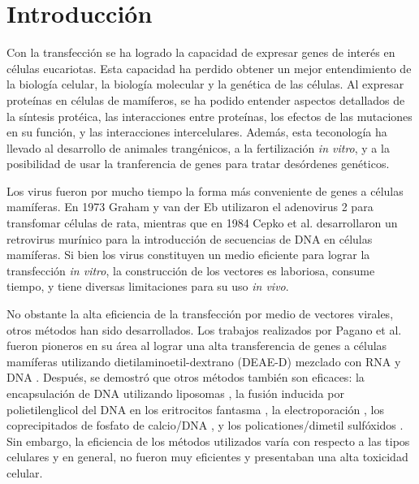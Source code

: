 \documentclass[fleqn,10pt]{SelfArx} %
\affiliation{\textsuperscript{1}\textit{Facultad de Ciencias Biológicas, Universidad Ricardo Palma, Lima, Peru}} %
\affiliation{*\textbf{Correspondencia}: jmanuel9112@icloud.com / giancuneo@gmail.com } %
\begin{document}
\flushbottom %

\maketitle %

\tableofcontents %

\thispagestyle{empty} %


\section{Introducción} 

Con la transfección se ha logrado la capacidad de expresar genes de interés en células eucariotas. Esta capacidad ha perdido obtener un mejor entendimiento de la biología celular, la biología molecular y la genética de las células. Al expresar proteínas en células de mamíferos, se ha podido entender aspectos detallados de la síntesis protéica, las interacciones entre proteínas, los efectos de las mutaciones en su función, y las interacciones intercelulares. Además, esta teconología ha llevado al desarrollo de animales trangénicos, a la fertilización \textit{in vitro}, y a la posibilidad de usar la tranferencia de genes para tratar desórdenes genéticos.

Los virus fueron por mucho tiempo la forma más conveniente de genes a células mamíferas. En 1973 Graham y van der Eb \cite{Graham:1973aa} utilizaron el adenovirus 2 para transfomar células de rata, mientras que en 1984 Cepko et al. \cite{Cepko:1984aa} desarrollaron un retrovirus murínico para la introducción de secuencias de DNA en células mamíferas. Si bien los virus constituyen un medio eficiente para lograr la transfección \textit{in vitro}, la construcción de los vectores es laboriosa, consume tiempo, y tiene diversas limitaciones para su uso \textit{in vivo}.

No obstante la alta eficiencia de la transfección por medio de vectores virales, otros métodos han sido desarrollados. Los trabajos realizados por Pagano et al. fueron pioneros en su área al lograr una alta transferencia de genes a células mamíferas utilizando dietilaminoetil-dextrano (DEAE-D) mezclado con RNA y DNA  \cite{McCutchan:1968aa, Pagano:1967aa}. Después, se demostró que otros métodos también son eficaces: la encapsulación de DNA utilizando liposomas \cite{Fraley:1980aa, Wong:1980aa, Straubinger:1983aa, Fraley:1981aa}, la fusión inducida por polietilenglicol del DNA en los eritrocitos fantasma \cite{Straus:1980aa}, la electroporación \cite{Neumann:1982aa}, los coprecipitados de fosfato de calcio/DNA \cite{Wigler:1979aa}, y los policationes/dimetil sulfóxidos \cite{Kawai:1984aa}. Sin embargo, la eficiencia de los métodos utilizados varía con respecto a las tipos celulares y en general, no fueron muy eficientes y presentaban una alta toxicidad celular.
\end{document}

